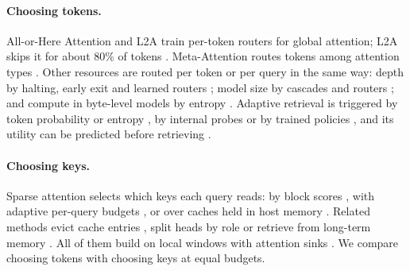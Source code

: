 \documentclass[11pt]{article}
\begin{document}
\paragraph{Choosing tokens.} All-or-Here Attention and L2A train per-token routers for global attention; L2A skips it for about 80\% of tokens \citep{luo2025aha,choudhary2026l2a}. Meta-Attention routes tokens among attention types \citep{ferrari2026metaattention}. Other resources are routed per token or per query in the same way: depth by halting, early exit and learned routers \citep{graves2016act,schuster2022calm,elhoushi2024layerskip,raposo2024mod,zhu2025ouro,bae2025mor,mohammed2026tsa}; model size by cascades and routers \citep{ding2024hybridllm,ong2024routellm,aggarwal2024automix,kotte2026ucci,bouchard2026escalation}; and compute in byte-level models by entropy \citep{pagnoni2024blt,zheng2026scratchpad,liu2026entropymoe,hwang2025hnet}. Adaptive retrieval is triggered by token probability or entropy \citep{jiang2023flare,wang2025targ}, by internal probes \citep{su2024dragin,yao2024seakr,baek2025probingrag} or by trained policies \citep{asai2024selfrag,schick2023toolformer,jin2025searchr1}, and its utility can be predicted before retrieving \citep{tian2026retrievalutility,shakya2026adaptiveretrieval}.

\paragraph{Choosing keys.} Sparse attention selects which keys each query reads: by block scores \citep{tang2024quest,jiang2024minference,yuan2025nsa,lu2025moba,deepseek2025v32,deepseek2026v41flash}, with adaptive per-query budgets \citep{gao2024seerattention,lin2025twilight,ahmad2026spotattention}, or over caches held in host memory \citep{woernle2026hga,kalyanarangan2026fathom}. Related methods evict cache entries \citep{zhang2023h2o,li2024snapkv}, split heads by role \citep{xiao2024duoattention} or retrieve from long-term memory \citep{wu2022memorizing,mohtashami2023landmark,xiao2024infllm,munkhdalai2024infini,borgeaud2022retro}. All of them build on local windows with attention sinks \citep{beltagy2020longformer,zaheer2020bigbird,xiao2024streamingllm}. We compare choosing tokens with choosing keys at equal budgets.
\end{document}
